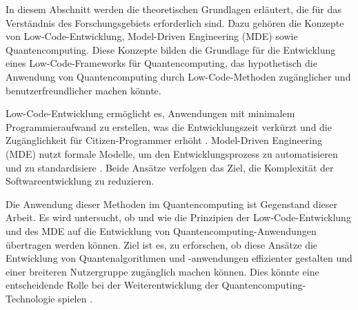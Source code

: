 In diesem Abschnitt werden die theoretischen Grundlagen erläutert, die für das Verständnis des Forschungsgebiets 
erforderlich sind. Dazu gehören die Konzepte von Low-Code-Entwicklung, Model-Driven Engineering (MDE) sowie 
Quantencomputing. Diese Konzepte bilden die Grundlage für die Entwicklung eines Low-Code-Frameworks für Quantencomputing, 
das hypothetisch die Anwendung von Quantencomputing durch Low-Code-Methoden zugänglicher und benutzerfreundlicher machen könnte.

Low-Code-Entwicklung ermöglicht es, Anwendungen mit minimalem Programmieraufwand zu erstellen, was die 
Entwicklungszeit verkürzt und die Zugänglichkeit für Citizen-Programmer erhöht \cite{Bock_2021}. Model-Driven Engineering (MDE) 
nutzt formale Modelle, um den Entwicklungsprozess zu automatisieren und zu standardisiere \cite{gemeinhardt_2021}. Beide Ansätze verfolgen 
das Ziel, die Komplexität der Softwareentwicklung zu reduzieren. 

Die Anwendung dieser Methoden im Quantencomputing ist Gegenstand dieser Arbeit. Es wird 
untersucht, ob und wie die Prinzipien der Low-Code-Entwicklung und des MDE auf die 
Entwicklung von Quantencomputing-Anwendungen übertragen werden können. Ziel ist es, 
zu erforschen, ob diese Ansätze die Entwicklung von Quantenalgorithmen und -anwendungen effizienter 
gestalten und einer breiteren Nutzergruppe zugänglich machen können. Dies könnte eine entscheidende 
Rolle bei der Weiterentwicklung der Quantencomputing-Technologie spielen \cite{Bock_2021} \cite{gemeinhardt_2021}.


